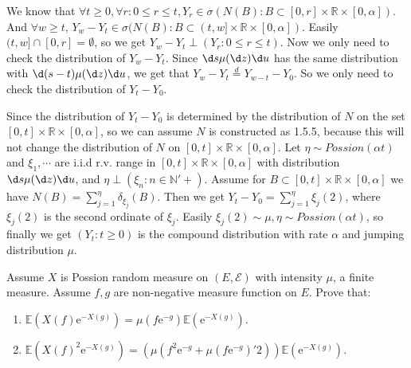 \documentclass{ctexart}
\begin{document}
\begin{solution}
  We know that \(\forall t \geq 0,\forall r:0 \leq r \leq t,Y_r \in \sigma(N(B):B \subset [0,r]\times \mathbb{R} \times [0,\alpha])\).
  And \(\forall w \geq t\), \(Y_w-Y_t \in \sigma(N(B):B \subset (t,w] \times \mathbb{R} \times [0,\alpha])\).
  Easily \((t,w] \cap [0,r]=\emptyset\), so we get \(Y_w-Y_t \perp (Y_r:0 \leq r \leq t)\).
  Now we only need to check the distribution of \(Y_w - Y_t\).
  Since \(\d s \mu(\d z) \d u\) has the same distribution with \(\d(s-t) \mu(\d z)\d u\), we get that \(Y_w - Y_t \overset{d}{=} Y_{w-t}-Y_0\).
  So we only need to check the distribution of \(Y_t-Y_0\).

  Since the distribution of \(Y_t-Y_0\) is determined by the distribution of \(N\) on the set \([0,t]\times \mathbb{R} \times [0,\alpha]\), so we can assume \(N\) is constructed as 1.5.5,
  because this will not change the distribution of \(N\) on \([0,t] \times \mathbb{R} \times [0,\alpha]\).
  Let \(\eta \sim Possion(\alpha t)\) and \(\xi_1,\cdots\) are i.i.d r.v. range in \([0,t] \times \mathbb{R} \times [0,\alpha]\) with distribution \(\d s \mu(\d z)\d u\), and \(\eta \perp (\xi_n:n \in \mathbb{N}'+)\).
  Assume for \(B \subset [0,t]\times \mathbb{R} \times [0,\alpha]\) we have \(N(B)=\sum_{j=1}^{\eta} \delta_{\xi_j}(B)\).
  Then we get \(Y_t-Y_0=\sum_{j=1}^{\eta} \xi_j(2)\), where \(\xi_j(2)\) is the second ordinate of \(\xi_j\).
  Easily \(\xi_j(2)\sim \mu,\eta \sim Possion(\alpha t)\), so finally we get \((Y_t:t \geq 0)\) is the compound distribution with rate \(\alpha\) and jumping distribution \(\mu\).
\end{solution}
\begin{problem}\label{pro:5}
  Assume \(X\) is Possion random measure on \((E,\mathcal{E})\) with intensity \(\mu\), a finite measure.
  Assume \(f,g\) are non-negative measure function on \(E\).
  Prove that:
  \begin{enumerate}
    \item \(\mathbb{E}(X(f)\mathrm{e}^{-X(g)})=\mu(f \mathrm{e}^{-g})\mathbb{E}(\mathrm{e}^{-X(g)})\).
    \item \(\mathbb{E}(X(f)^2 \mathrm{e}^{-X(g)})=(\mu(f^2 \mathrm{e}^{-g}+\mu(f \mathrm{e}^{-g})'2))\mathbb{E}(\mathrm{e}^{-X(g)})\).
  \end{enumerate}
\end{problem}
\end{document}
